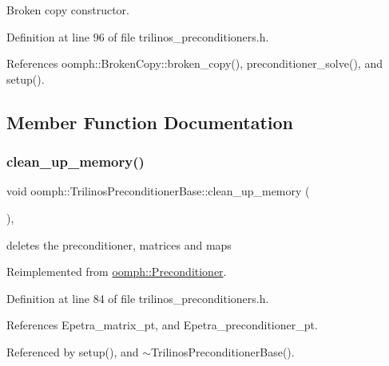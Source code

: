 Broken copy constructor. 



Definition at line 96 of file trilinos\+\_\+preconditioners.\+h.



References oomph\+::\+Broken\+Copy\+::broken\+\_\+copy(), preconditioner\+\_\+solve(), and setup().



\subsection{Member Function Documentation}
\mbox{\label{classoomph_1_1TrilinosPreconditionerBase_a6cc1da6ffb61bec844ccd33f6e5e8807}} 
\subsubsection{\texorpdfstring{clean\+\_\+up\+\_\+memory()}{clean\_up\_memory()}}
{\footnotesize\ttfamily void oomph\+::\+Trilinos\+Preconditioner\+Base\+::clean\+\_\+up\+\_\+memory (\begin{DoxyParamCaption}{ }\end{DoxyParamCaption})\hspace{0.3cm}{\ttfamily [inline]}, {\ttfamily [virtual]}}



deletes the preconditioner, matrices and maps 



Reimplemented from \hyperlink{classoomph_1_1Preconditioner_a46c31c416829bedcd9db238431262027}{oomph\+::\+Preconditioner}.



Definition at line 84 of file trilinos\+\_\+preconditioners.\+h.



References Epetra\+\_\+matrix\+\_\+pt, and Epetra\+\_\+preconditioner\+\_\+pt.



Referenced by setup(), and $\sim$\+Trilinos\+Preconditioner\+Base().

\mbox{\label{classoomph_1_1TrilinosPreconditionerBase_a3c4fd2ed97b76c0eabfe80431241f706}} 
